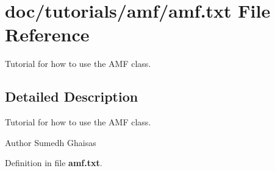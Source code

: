 \section{doc/tutorials/amf/amf.txt File Reference}
\label{amf_8txt}


Tutorial for how to use the A\-M\-F class.  




\subsection{Detailed Description}
Tutorial for how to use the A\-M\-F class. \begin{DoxyAuthor}{Author}
Sumedh Ghaisas 
\end{DoxyAuthor}


Definition in file {\bf amf.\-txt}.


